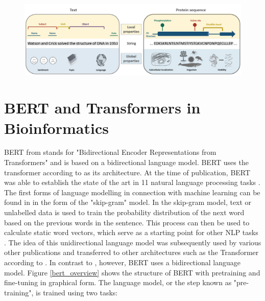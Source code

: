 \begin{figure}[h]
 \centering
 \includegraphics[width=15cm]{images/protein_representation.png}
 \caption{\citep{Ofer2021}}
 \label{protein representation}
\end{figure}

\section{BERT and Transformers in Bioinformatics}


BERT from \cite{Devlin2019} stands for "Bidirectional Encoder Representations from Transformers" and is based on a bidirectional language model. BERT uses the transformer according to \cite{Vaswani2017} as its architecture. At the time of publication, BERT was able to establish the state of the art in 11 natural language processing tasks \citep{Devlin2019}. The first forms of language modelling in connection with machine learning can be found in \cite{Mikolov2013} in the form of the "skip-gram" model. In the skip-gram model, text or unlabelled data is used to train the probability distribution of the next word based on the previous words in the sentence. This process can then be used to calculate static word vectors, which serve as a starting point for other NLP tasks \citep{Mikolov2013a}. The idea of this unidirectional language model was subsequently used by various other publications and transferred to other architectures such as the Transformer according to \cite{Vaswani2017} \citep{Radford2018ImprovingLU}. In contrast to \cite{Radford2018ImprovingLU}, however, BERT uses a bidirectional language model. Figure \ref{bert_overview} shows the structure of BERT with pretraining and fine-tuning in graphical form. The language model, or the step known as "pre-training", is trained using two tasks:

